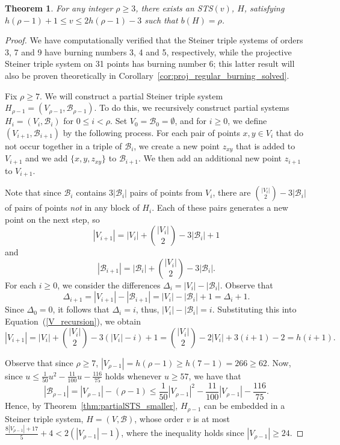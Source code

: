 \documentclass[12pt]{article}
\newtheorem{theorem}{Theorem}[section]
\theoremstyle{definition}
\numberwithin{table}{section}
\newcommand{\round}{{\rho}}
\begin{document}
\begin{theorem}\label{thm:AllBurningNumbers}
For any integer 
$\round \geq 3$, 
there exists an STS$(v)$,
$H$, satisfying $h(\round-1)+1 \leq v \leq 2h(\round-1)-3$ such that  $b(H)=\round$.   
\end{theorem}
\begin{proof}
We have computationally verified that the Steiner triple systems of orders 3, 7 and 9 have burning numbers 3, 4 and 5, respectively, while the projective Steiner triple system on 31 points has burning number 6; this latter result will also be proven theoretically in Corollary~\ref{cor:proj_regular_burning_solved}.

Fix $\round\geq 7$. We will construct a partial Steiner triple system $H_{\round-1}=(V_{\round-1},\mathcal{B}_{\round-1})$.
To do this, we recursively construct partial systems $H_i = (V_i, \mathcal{B}_i)$ for $0\leq i< \round$. Set  $V_0=\mathcal{B}_0 = \emptyset$, and for $i\geq 0$, we define $(V_{i+1}, \mathcal{B}_{i+1})$ by the following process.
For each pair of points $x,y \in V_i$ that do not occur together in a triple of $\mathcal{B}_i$, we create a new point $z_{xy}$ that is added to $V_{i+1}$ and we add $\{x,y,z_{xy}\}$ to $\mathcal{B}_{i+1}$. 
We then add an additional new point $z_{i+1}$ to $V_{i+1}$. 

Note that since $\mathcal{B}_i$ contains $3|\mathcal{B}_i|$ pairs of points from $V_i$, there are $\binom{|V_i|}{2} -3|\mathcal{B}_i|$ of pairs of points \emph{not} in any block of $H_i$. Each of these pairs generates a new point on the next step, so
\begin{equation}
\label{V_recursion}
|V_{i+1}| = |V_i| + \binom{|V_i|}{2} -3|\mathcal{B}_i| + 1
\end{equation}
and
\begin{equation*}
\label{B_recursion}
|\mathcal{B}_{i+1}| = |\mathcal{B}_i| + \binom{|V_i|}{2} - 3|\mathcal{B}_i|.
\end{equation*}
For each $i \geq 0$, we consider the differences $\Delta_{i} =  |V_{i}|-|\mathcal{B}_{i}|$. Observe that
$$\Delta_{i+1} = |V_{i+1}|-|\mathcal{B}_{i+1}| = |V_i|-|\mathcal{B}_i| + 1 = \Delta_i + 1.$$
Since $\Delta_0=0$, it follows that $\Delta_i=i$, thus, $|V_{i}|-|\mathcal{B}_{i}| = i$. Substituting this into Equation~(\ref{V_recursion}), we obtain
\[
|V_{i+1}| = |V_i| +\binom{|V_i|}{2} -3(|V_i|-i) + 1
= \binom{|V_i|}{2} -2|V_i| +3(i+1) -2 = h(i+1).
\]

Observe that since $\round\geq 7$,
$|V_{\round-1}| = h(\round-1) \geq h(7-1)=266 \geq 62$.
Now, since $u \leq \frac{1}{50}u^2 - \frac{11}{100}u - \frac{116}{75}$ holds whenever $u\geq 57$, we have that
\[
|\mathcal{B}_{\round-1}| = |V_{\round-1}|-(\round-1) \leq \frac{1}{50}|V_{\round-1}|^2 - \frac{11}{100}|V_{\round-1}| - \frac{116}{75}. 
\]
Hence, by Theorem~\ref{thm:partialSTS_smaller}, $H_{\round-1}$ can be embedded in a Steiner triple system, $H=(V,\mathcal{B})$, whose order $v$ is at most $\frac{8|V_{\round-1}|+17}{5} + 4 < 2(|V_{\round-1}|-1)$, where the inequality holds since $|V_{\round-1}| \geq 24$. 


\end{proof}
\end{document}
